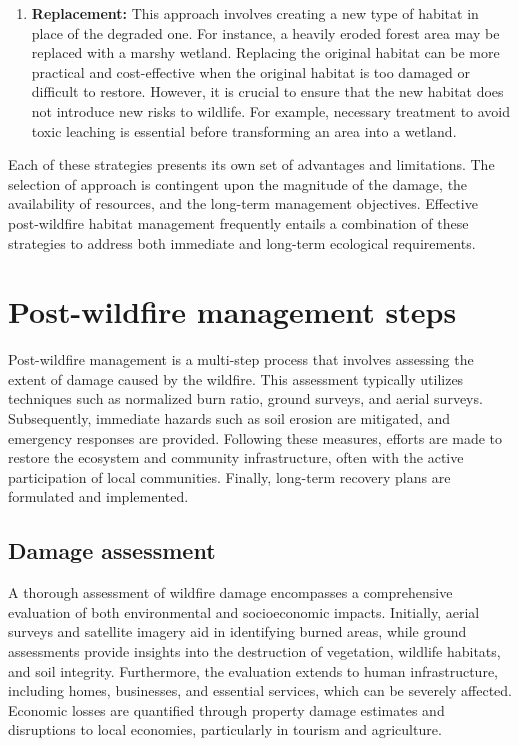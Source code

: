 \documentclass[
  12 pt,
]{Nemilov}
\begin{document}
\begin{enumerate}
\item
  \textbf{Replacement:} This approach involves creating a new type of habitat in place of the degraded one. For instance, a heavily eroded forest area may be replaced with a marshy wetland. Replacing the original habitat can be more practical and cost-effective when the original habitat is too damaged or difficult to restore. However, it is crucial to ensure that the new habitat does not introduce new risks to wildlife. For example, necessary treatment to avoid toxic leaching is essential before transforming an area into a wetland.
\end{enumerate}

Each of these strategies presents its own set of advantages and limitations. The selection of approach is contingent upon the magnitude of the damage, the availability of resources, and the long-term management objectives. Effective post-wildfire habitat management frequently entails a combination of these strategies to address both immediate and long-term ecological requirements.

\section{Post-wildfire management steps}\label{post-wildfire-management-steps}

Post-wildfire management is a multi-step process that involves assessing the extent of damage caused by the wildfire. This assessment typically utilizes techniques such as normalized burn ratio, ground surveys, and aerial surveys. Subsequently, immediate hazards such as soil erosion are mitigated, and emergency responses are provided. Following these measures, efforts are made to restore the ecosystem and community infrastructure, often with the active participation of local communities. Finally, long-term recovery plans are formulated and implemented.

\subsection{Damage assessment}\label{damage-assessment}

A thorough assessment of wildfire damage encompasses a comprehensive evaluation of both environmental and socioeconomic impacts. Initially, aerial surveys and satellite imagery aid in identifying burned areas, while ground assessments provide insights into the destruction of vegetation, wildlife habitats, and soil integrity. Furthermore, the evaluation extends to human infrastructure, including homes, businesses, and essential services, which can be severely affected. Economic losses are quantified through property damage estimates and disruptions to local economies, particularly in tourism and agriculture.
\end{document}
